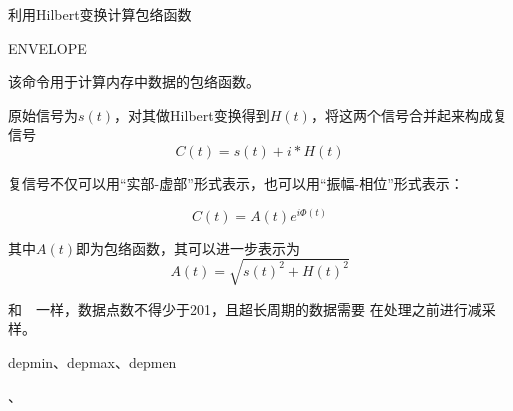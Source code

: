 \label{cmd:envelope}

利用Hilbert变换计算包络函数

\begin{SACSTX}
ENVELOPE
\end{SACSTX}

该命令用于计算内存中数据的包络函数。

原始信号为$s(t)$，对其做Hilbert变换得到$H(t)$，将这两个信号合并起来构成复信号
\[
    C(t) = s(t) + i*H(t)
\]

复信号不仅可以用``实部-虚部''形式表示，也可以用``振幅-相位''形式表示：

\[
    C(t) = A(t) e^{i\Phi(t)}
\]

其中$A(t)$即为包络函数，其可以进一步表示为
\[
    A(t) = \sqrt{s(t)^2+H(t)^2}
\]

和~~一样，数据点数不得少于201，且超长周期的数据需要
在处理之前进行减采样。

depmin、depmax、depmen

、
